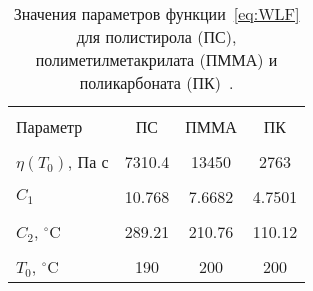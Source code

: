 \begin{table}[h]
	\centering
	\caption{Значения параметров функции~\ref{eq:WLF} для полистирола (ПС), полиметилметакрилата (ПММА) и поликарбоната (ПК)~\cite{aho2008measurement_WLF}.}
	\begin{tabular}{l c c c}
		\hline \hline \\ [-1em]
		Параметр \hspace{2em} & ПС \hspace{2em} & ПММА \hspace{2em} & ПК
		\\ \hline \\ [-1em]
		$\eta(T_0)$, Па с \hspace{2em} & 7310.4 \hspace{2em} & 13450 \hspace{2em} & 2763
		\\ \\ [-1em]
		$C_1$ \hspace{2em} & 10.768 \hspace{2em} & 7.6682 \hspace{2em} & 4.7501
		\\ \\ [-1em]
		$C_2$, $^\circ$C \hspace{2em} & 289.21 \hspace{2em} & 210.76 \hspace{2em} & 110.12
		\\ \\ [-1em]
		$T_0$, $^\circ$C \hspace{2em} & 190 \hspace{2em} & 200 \hspace{2em} & 200
		\\ \hline \hline
	\end{tabular}
\label{table:WLF}
\end{table}


